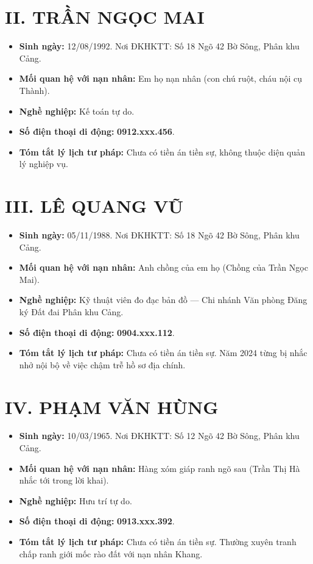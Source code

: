 \documentclass[12pt,a4paper]{article}
\begin{document}
\section*{II. TRẦN NGỌC MAI}
\begin{itemize}[leftmargin=1.5cm]
    \item \textbf{Sinh ngày:} 12/08/1992. Nơi ĐKHKTT: Số 18 Ngõ 42 Bờ Sông, Phân khu Cảng.
    \item \textbf{Mối quan hệ với nạn nhân:} Em họ nạn nhân (con chú ruột, cháu nội cụ Thành).
    \item \textbf{Nghề nghiệp:} Kế toán tự do.
    \item \textbf{Số điện thoại di động:} \textbf{0912.xxx.456}.
    \item \textbf{Tóm tắt lý lịch tư pháp:} Chưa có tiền án tiền sự, không thuộc diện quản lý nghiệp vụ.
\end{itemize}

\section*{III. LÊ QUANG VŨ}
\begin{itemize}[leftmargin=1.5cm]
    \item \textbf{Sinh ngày:} 05/11/1988. Nơi ĐKHKTT: Số 18 Ngõ 42 Bờ Sông, Phân khu Cảng.
    \item \textbf{Mối quan hệ với nạn nhân:} Anh chồng của em họ (Chồng của Trần Ngọc Mai).
    \item \textbf{Nghề nghiệp:} Kỹ thuật viên đo đạc bản đồ — Chi nhánh Văn phòng Đăng ký Đất đai Phân khu Cảng.
    \item \textbf{Số điện thoại di động:} \textbf{0904.xxx.112}.
    \item \textbf{Tóm tắt lý lịch tư pháp:} Chưa có tiền án tiền sự. Năm 2024 từng bị nhắc nhở nội bộ về việc chậm trễ hồ sơ địa chính.
\end{itemize}

\section*{IV. PHẠM VĂN HÙNG}
\begin{itemize}[leftmargin=1.5cm]
    \item \textbf{Sinh ngày:} 10/03/1965. Nơi ĐKHKTT: Số 12 Ngõ 42 Bờ Sông, Phân khu Cảng.
    \item \textbf{Mối quan hệ với nạn nhân:} Hàng xóm giáp ranh ngõ sau (Trần Thị Hà nhắc tới trong lời khai).
    \item \textbf{Nghề nghiệp:} Hưu trí tự do.
    \item \textbf{Số điện thoại di động:} \textbf{0913.xxx.392}.
    \item \textbf{Tóm tắt lý lịch tư pháp:} Chưa có tiền án tiền sự. Thường xuyên tranh chấp ranh giới mốc rào đất với nạn nhân Khang.
\end{itemize}
\end{document}
